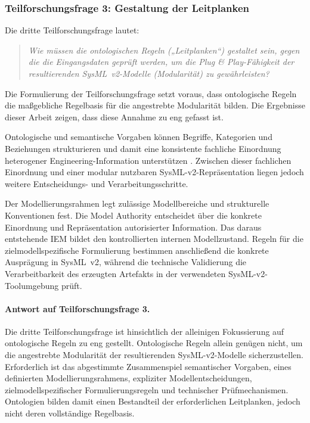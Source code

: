 \subsubsection{Teilforschungsfrage 3: Gestaltung der Leitplanken}
\label{sec:discussion_rq3}

Die dritte Teilforschungsfrage lautet:

\begin{quote}
\textit{Wie müssen die ontologischen Regeln („Leitplanken“) gestaltet sein,
gegen die die Eingangsdaten geprüft werden, um die Plug \& Play-Fähigkeit
der resultierenden SysML~v2-Modelle (Modularität) zu gewährleisten?}
\end{quote}

Die Formulierung der Teilforschungsfrage setzt voraus, dass ontologische
Regeln die maßgebliche Regelbasis für die angestrebte Modularität bilden.
Die Ergebnisse dieser Arbeit zeigen, dass diese Annahme zu eng gefasst ist.

Ontologische und semantische Vorgaben können Begriffe, Kategorien und
Beziehungen strukturieren und damit eine konsistente fachliche Einordnung
heterogener Engineering-Information unterstützen
\cite{ISO21838_2_2021,OrellanaMandrick2019,Lu2022}. Zwischen dieser
fachlichen Einordnung und einer modular nutzbaren SysML-v2-Repräsentation
liegen jedoch weitere Entscheidungs- und Verarbeitungsschritte.

Der Modellierungsrahmen legt zulässige Modellbereiche und strukturelle
Konventionen fest. Die Model Authority entscheidet über die konkrete
Einordnung und Repräsentation autorisierter Information. Das daraus
entstehende IEM bildet den kontrollierten internen Modellzustand. Regeln für
die zielmodellspezifische Formulierung bestimmen anschließend die konkrete
Ausprägung in SysML~v2, während die technische Validierung die
Verarbeitbarkeit des erzeugten Artefakts in der verwendeten
SysML-v2-Toolumgebung prüft.

\paragraph{Antwort auf Teilforschungsfrage 3.}

Die dritte Teilforschungsfrage ist hinsichtlich der alleinigen Fokussierung
auf ontologische Regeln zu eng gestellt. Ontologische Regeln allein genügen
nicht, um die angestrebte Modularität der resultierenden SysML-v2-Modelle
sicherzustellen. Erforderlich ist das abgestimmte Zusammenspiel semantischer
Vorgaben, eines definierten Modellierungsrahmens, expliziter
Modellentscheidungen, zielmodellspezifischer Formulierungsregeln und
technischer Prüfmechanismen. Ontologien bilden damit einen Bestandteil der
erforderlichen Leitplanken, jedoch nicht deren vollständige Regelbasis.



